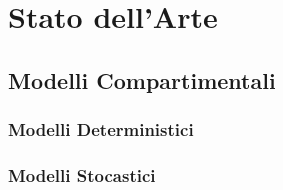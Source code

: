 \section{Stato dell'Arte}

\subsection{Modelli Compartimentali}

\subsubsection{Modelli Deterministici}

\subsubsection{Modelli Stocastici}